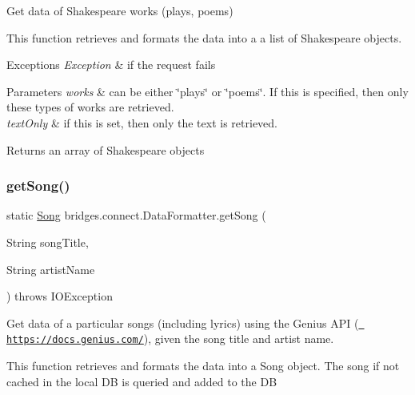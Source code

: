 Get data of Shakespeare works (plays, poems)

This function retrieves and formats the data into a a list of Shakespeare objects.


\begin{DoxyExceptions}{Exceptions}
{\em Exception} & if the request fails\\
\hline
\end{DoxyExceptions}

\begin{DoxyParams}{Parameters}
{\em works} & can be either \char`\"{}plays\char`\"{} or \char`\"{}poems\char`\"{}. If this is specified, then only these types of works are retrieved. \\
\hline
{\em text\+Only} & if this is set, then only the text is retrieved. \\
\hline
\end{DoxyParams}
\begin{DoxyReturn}{Returns}
an array of Shakespeare objects 
\end{DoxyReturn}
\mbox{\label{classbridges_1_1connect_1_1_data_formatter_ad1d2071025ce9daa42ab69af8eb4749b}} 
\subsubsection{\texorpdfstring{getSong()}{getSong()}}
{\footnotesize\ttfamily static \mbox{\hyperlink{classbridges_1_1data__src__dependent_1_1_song}{Song}} bridges.\+connect.\+Data\+Formatter.\+get\+Song (\begin{DoxyParamCaption}\item[{String}]{song\+Title,  }\item[{String}]{artist\+Name }\end{DoxyParamCaption}) throws I\+O\+Exception\hspace{0.3cm}{\ttfamily [static]}}

Get data of a particular songs (including lyrics) using the Genius A\+PI (\href{https://docs.genius.com/}{\texttt{ https\+://docs.\+genius.\+com/}}), given the song title and artist name.

This function retrieves and formats the data into a Song object. The song if not cached in the local DB is queried and added to the DB


